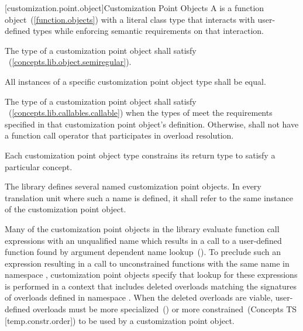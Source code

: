 \begin{addedblock}
[customization.point.object]{Customization Point Objects}
\pnum
A  is a function object~(\ref{function.objects}) with a
literal class type that interacts with user-defined types while
enforcing semantic requirements on that interaction.

\pnum
The type of a customization point object shall satisfy
~(\ref{concepts.lib.object.semiregular}).

\pnum
All instances of a specific customization point object type shall
be equal.

\pnum
The type of a customization point object  shall satisfy
~(\ref{concepts.lib.callables.callable}) when the types of
 meet the requirements specified in that
customization point object's definition. Otherwise, 
shall not have a function call operator that participates in
overload resolution.

\pnum
Each customization point object type constrains its return type
to satisfy a particular concept.

\pnum
The library defines several named customization point objects.
In every translation unit where such a name is defined, it shall
refer to the same instance of the customization point object.

\pnum
\enternote Many of the customization point objects in the library
evaluate function call expressions with an unqualified name which
results in a call to a user-defined function found by argument
dependent name lookup~(). To preclude
such an expression resulting in a call to unconstrained functions
with the same name in namespace , customization point
objects specify that lookup for these expressions is performed in
a context that includes deleted overloads matching the signatures
of overloads defined in namespace . When the deleted
overloads are viable, user-defined overloads must be more
specialized~() or more
constrained~(Concepts TS [temp.constr.order]) to be used by a
customization point object. \exitnote
\end{addedblock}
